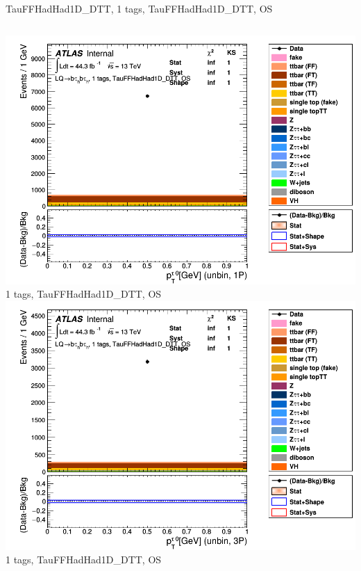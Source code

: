\begin{frame}{TauFFHadHad1D\_DTT, 1 tags, TauFFHadHad1D\_DTT, OS}
\begin{columns}[c]
    \centering\includegraphics[width=\textwidth]{C_1tag2pjet_0ptv_OS_UnbinLeadTau1P}\\
    1 tags, TauFFHadHad1D\_DTT, OS
    \centering\includegraphics[width=\textwidth]{C_1tag2pjet_0ptv_OS_UnbinLeadTau3P}\\
    1 tags, TauFFHadHad1D\_DTT, OS
  \end{columns}
\end{frame}

